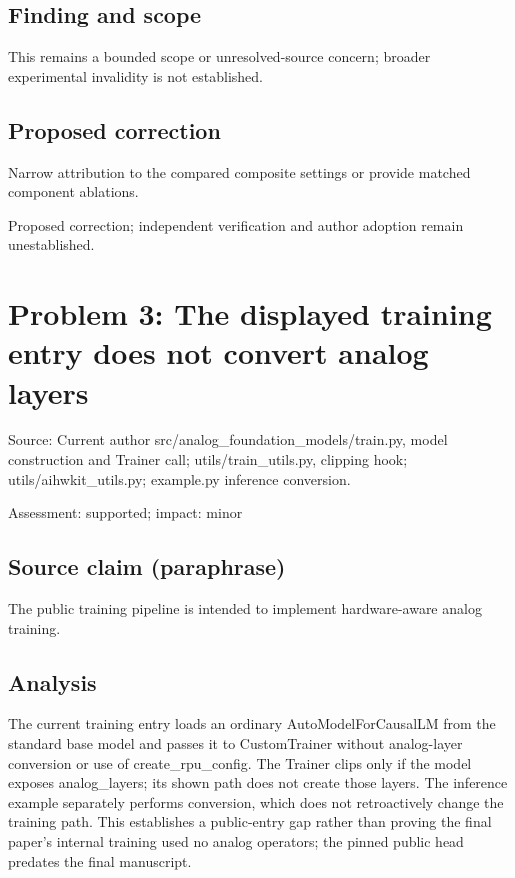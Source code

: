 \documentclass[11pt]{article}
\begin{document}
\subsection*{Finding and scope}

This remains a bounded scope or unresolved-source concern; broader experimental invalidity is not established.

\subsection*{Proposed correction}

Narrow attribution to the compared composite settings or provide matched component ablations.

Proposed correction; independent verification and author adoption remain unestablished.

\section*{Problem 3: The displayed training entry does not convert analog layers}

Source: Current author src/analog\_foundation\_models/train.py, model construction and Trainer call; utils/train\_utils.py, clipping hook; utils/aihwkit\_utils.py; example.py inference conversion.

Assessment: supported; impact: minor

\subsection*{Source claim (paraphrase)}

The public training pipeline is intended to implement hardware-aware analog training.

\subsection*{Analysis}

The current training entry loads an ordinary AutoModelForCausalLM from the standard base model and passes it to CustomTrainer without analog-layer conversion or use of create\_rpu\_config. The Trainer clips only if the model exposes analog\_layers; its shown path does not create those layers. The inference example separately performs conversion, which does not retroactively change the training path. This establishes a public-entry gap rather than proving the final paper’s internal training used no analog operators; the pinned public head predates the final manuscript.
\end{document}

